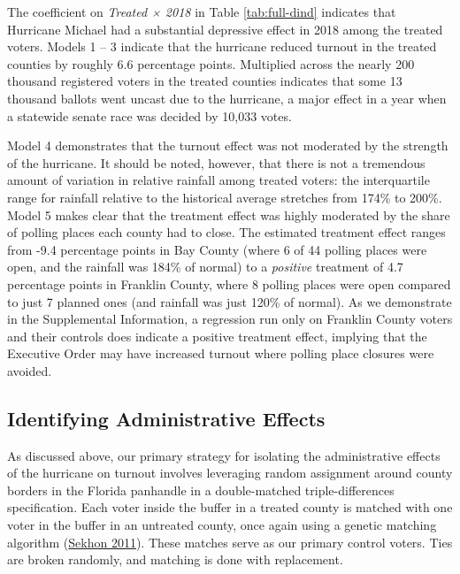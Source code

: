 \documentclass[
  12pt,
]{article}
\begin{document}
\begin{singlespace}

\end{singlespace}

The coefficient on \emph{Treated × 2018} in Table \ref{tab:full-dind} indicates that Hurricane Michael had a substantial depressive effect in 2018 among the treated voters. Models 1 -- 3 indicate that the hurricane reduced turnout in the treated counties by roughly 6.6 percentage points. Multiplied across the nearly 200 thousand registered voters in the treated counties indicates that some 13 thousand ballots went uncast due to the hurricane, a major effect in a year when a statewide senate race was decided by 10,033 votes.

Model 4 demonstrates that the turnout effect was not moderated by the strength of the hurricane. It should be noted, however, that there is not a tremendous amount of variation in relative rainfall among treated voters: the interquartile range for rainfall relative to the historical average stretches from 174\% to 200\%. Model 5 makes clear that the treatment effect was highly moderated by the share of polling places each county had to close. The estimated treatment effect ranges from -9.4 percentage points in Bay County (where 6 of 44 polling places were open, and the rainfall was 184\% of normal) to a \emph{positive} treatment of 4.7 percentage points in Franklin County, where 8 polling places were open compared to just 7 planned ones (and rainfall was just 120\% of normal). As we demonstrate in the Supplemental Information, a regression run only on Franklin County voters and their controls does indicate a positive treatment effect, implying that the Executive Order may have increased turnout where polling place closures were avoided.

\hypertarget{identifying-administrative-effects}{%
\subsection*{Identifying Administrative Effects}\label{identifying-administrative-effects}}

As discussed above, our primary strategy for isolating the administrative effects of the hurricane on turnout involves leveraging random assignment around county borders in the Florida panhandle in a double-matched triple-differences specification. Each voter inside the buffer in a treated county is matched with one voter in the buffer in an untreated county, once again using a genetic matching algorithm (\protect\hyperlink{ref-Sekhon2011}{Sekhon 2011}). These matches serve as our primary control voters. Ties are broken randomly, and matching is done with replacement.
\end{document}
